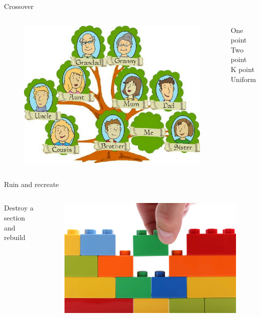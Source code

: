 \documentclass[24pt]{beamer}
\begin{document}
    \begin{frame}{Crossover}
        \begin{columns}
                \begin{figure}
                \includegraphics[scale=0.3]{family}
                \end{figure}
                One point\\
                Two point\\
                K point\\
                Uniform
        \end{columns}
    \end{frame}

    \begin{frame}{Ruin and recreate}
        \begin{columns}
                Destroy a section and rebuild
                \begin{figure}
                \includegraphics[scale=0.1]{rebuild}
                \end{figure}
        \end{columns}
    \end{frame}
\end{document}
